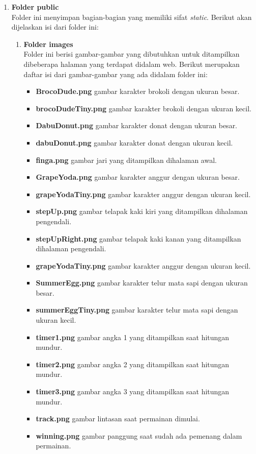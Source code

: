 \begin{enumerate}
	\item \textbf{Folder public} \\
	Folder ini menyimpan bagian-bagian yang memiliki sifat \textit{static}. Berikut akan dijelaskan isi dari folder ini:
	\begin{enumerate}
		\item \textbf{Folder images} \\
		Folder ini berisi gambar-gambar yang dibutuhkan untuk ditampilkan dibeberapa halaman yang terdapat didalam web. Berikut merupakan daftar isi dari gambar-gambar yang ada didalam folder ini: 
		\begin{itemize}
			\item \textbf{BrocoDude.png} gambar karakter brokoli dengan ukuran besar.
			\item \textbf{brocoDudeTiny.png} gambar karakter brokoli dengan ukuran kecil.
			\item \textbf{DabuDonut.png} gambar karakter donat dengan ukuran besar.
			\item \textbf{dabuDonut.png} gambar karakter donat dengan ukuran kecil.
			\item \textbf{finga.png} gambar jari yang ditampilkan dihalaman awal.
			\item \textbf{GrapeYoda.png} gambar karakter anggur dengan ukuran besar.
			\item \textbf{grapeYodaTiny.png} gambar karakter anggur dengan ukuran kecil.
			\item \textbf{stepUp.png} gambar telapak kaki kiri yang ditampilkan dihalaman pengendali.
			\item \textbf{stepUpRight.png} gambar telapak kaki kanan yang ditampilkan dihalaman pengendali.
			\item \textbf{grapeYodaTiny.png} gambar karakter anggur dengan ukuran kecil.
			\item \textbf{SummerEgg.png} gambar karakter telur mata sapi dengan ukuran besar.
			\item \textbf{summerEggTiny.png} gambar karakter telur mata sapi dengan ukuran kecil.
			\item \textbf{timer1.png} gambar angka 1 yang ditampilkan saat hitungan mundur.
			\item \textbf{timer2.png} gambar angka 2 yang ditampilkan saat hitungan mundur.
			\item \textbf{timer3.png} gambar angka 3 yang ditampilkan saat hitungan mundur.
			\item \textbf{track.png} gambar lintasan saat permainan dimulai.
			\item \textbf{winning.png} gambar panggung saat sudah ada pemenang dalam permainan.
		\end{itemize}
	

\end{enumerate}
\end{enumerate}
